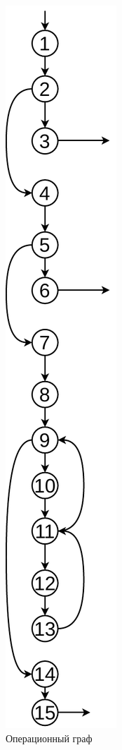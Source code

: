 \begin{figure}[h]
	\centering
	\includegraphics[height=0.9\textheight]{img/ГУ.pdf}
	\caption{Операционный граф}
	\label{fig:g1}
\end{figure}

